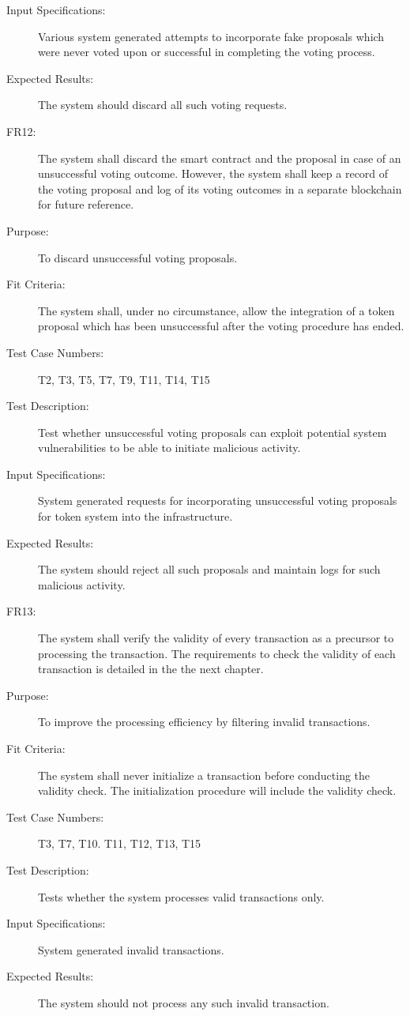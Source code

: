 \documentclass[a4paper,twoside,phd]{BYUPhys}
\begin{document}
\begin{description}
\item[Input Specifications:] Various system generated attempts to incorporate fake proposals which were never voted upon or successful in completing the voting process.
\item[Expected Results:] The system should discard all such voting requests.
\\
\item[FR12:] The system shall discard the smart contract and the proposal in case of an unsuccessful voting outcome. However, the system shall keep a record of the voting proposal and log of its voting outcomes in a separate blockchain for future reference.
\item[Purpose:] To discard unsuccessful voting proposals.
\item[Fit Criteria:] The system shall, under no circumstance, allow the integration of a token proposal which has been unsuccessful after the voting procedure has ended.
\item[Test Case Numbers:] T2, T3, T5, T7, T9, T11, T14, T15
\item[Test Description:] Test whether unsuccessful voting proposals can exploit potential system vulnerabilities to be able to initiate malicious activity.
\item[Input Specifications:] System generated requests for incorporating unsuccessful voting proposals for token system into the infrastructure.
\item[Expected Results:] The system should reject all such proposals and maintain logs for such malicious activity.
\\
\item[FR13:] The system shall verify the validity of every transaction as a precursor to processing the transaction. The requirements to check the validity of each transaction is detailed in the the next chapter.
\item[Purpose:] To improve the processing efficiency by filtering invalid transactions.
\item[Fit Criteria:] The system shall never initialize a transaction before conducting the validity check. The initialization procedure will include the validity check. 
\item[Test Case Numbers:] T3, T7, T10. T11, T12, T13, T15
\item[Test Description:] Tests whether the system processes valid transactions only.
\item[Input Specifications:] System generated invalid transactions.
\item[Expected Results:] The system should not process any such invalid transaction.

\end{description}
\end{document}
